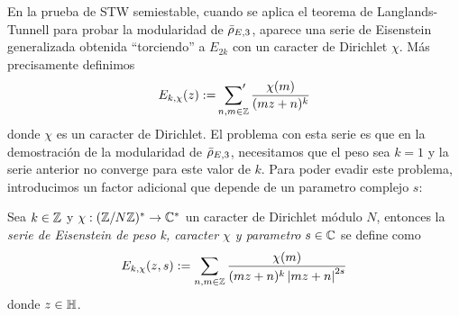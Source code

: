 %




En la prueba de STW semiestable, cuando se aplica el teorema de Langlands-Tunnell para probar la
modularidad de $\bar{\rho}_{E,3}$, aparece una serie de Eisenstein generalizada obtenida ``torciendo'' a $E_{2k}$
con un caracter de Dirichlet $\chi$. M\'as precisamente definimos
\[
  E_{k,\chi}(z):=\sideset{}{'}\sum_{n,m\in\mathbb{Z}}\frac{\chi(m)}{(mz+n)^k}
\]
donde $\chi$ es un caracter de Dirichlet.
El problema con esta serie es que en la demostraci\'on de la modularidad de $\bar{\rho}_{E,3}$, necesitamos
que el peso sea $k=1$ y la serie anterior no converge para este valor de $k$. Para poder evadir
este problema, introducimos un factor adicional que depende de un parametro complejo $s$:

\begin{defin}%
  Sea $k\in\mathbb{Z}$ y $\chi:(\mathbb{Z}/N\mathbb{Z})^*\rightarrow\mathbb{C}^*$ un caracter de Dirichlet m\'odulo $N$,
  entonces la \emph{serie de Eisenstein de peso k, caracter $\chi$ y parametro} $s\in\mathbb{C}$ se define como
  \[
    E_{k,\chi}(z,s):=\sum_{n,m\in\mathbb{Z}}\frac{\chi(m)}{(mz+n)^{k}\left| mz+n \right|^{2s}}
  \]
  donde $z\in\mathbb{H}$.
\end{defin}%

